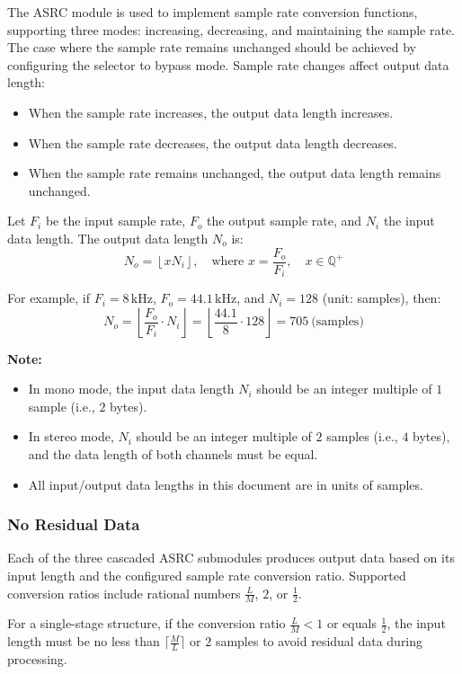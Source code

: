 \documentclass[main\_\_EN.tex]{subfiles}
\begin{document}
The ASRC module is used to implement sample rate conversion functions, supporting three modes: increasing, decreasing, and maintaining the sample rate. The case where the sample rate remains unchanged should be achieved by configuring the selector to bypass mode. Sample rate changes affect output data length:

\begin{itemize}
  \item When the sample rate increases, the output data length increases.
  \item When the sample rate decreases, the output data length decreases.
  \item When the sample rate remains unchanged, the output data length remains unchanged.
\end{itemize}

Let $F_i$ be the input sample rate, $F_o$ the output sample rate, and $N_i$ the input data length. The output data length $N_o$ is:
\[
N_o = \left\lfloor x N_i \right\rfloor, \quad \text{where } x = \frac{F_o}{F_i}, \quad x \in \mathbb{Q}^+
\]

For example, if $F_i = 8\,\mathrm{kHz}$, $F_o = 44.1\,\mathrm{kHz}$, and $N_i = 128$ (unit: samples), then:
\[
N_o = \left\lfloor \frac{F_o}{F_i} \cdot N_i \right\rfloor = \left\lfloor \frac{44.1}{8} \cdot 128 \right\rfloor = 705\ \text{(samples)}
\]


\textbf{Note:}
\begin{itemize}
  \item In mono mode, the input data length $N_i$ should be an integer multiple of $1$ sample (i.e., $2$ bytes).
  \item In stereo mode, $N_i$ should be an integer multiple of $2$ samples (i.e., $4$ bytes), and the data length of both channels must be equal.
  \item All input/output data lengths in this document are in units of samples.
\end{itemize}


\subsubsection{No Residual Data}

Each of the three cascaded ASRC submodules produces output data based on its input length and the configured sample rate conversion ratio. Supported conversion ratios include rational numbers $\frac{L}{M}$, $2$, or $\frac{1}{2}$.

For a single-stage structure, if the conversion ratio $\frac{L}{M} < 1$ or equals $\frac{1}{2}$, the input length must be no less than $\lceil \frac{M}{L} \rceil$ or $2$ samples to avoid residual data during processing.
\end{document}
